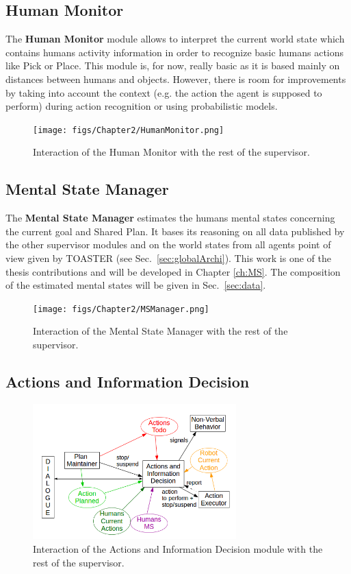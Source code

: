 \documentclass[english,a4paper,11pt,twoside]{StyleThese}
\begin{document}
\subsection{Human Monitor}

The \textbf{Human Monitor} module allows to interpret the current world state which contains humans activity information in order to recognize basic humans actions like Pick or Place. This module is, for now, really basic as it is based mainly on distances between humans and objects. However, there is room for improvements by taking into account the context (e.g. the action the agent is supposed to perform) during action recognition or using probabilistic models.


\begin{figure}[!h]
	\centering
    \texttt{[image: figs/Chapter2/HumanMonitor.png]}
    \caption{Interaction of the Human Monitor with the rest of the supervisor.}
    \label{fig:humanMonitor}
\end{figure}

\subsection{Mental State Manager}

The \textbf{Mental State Manager} estimates the humans mental states concerning the current goal and Shared Plan. It bases its reasoning on all data published by the other supervisor modules and on the world states from all agents point of view given by TOASTER (see Sec.~\ref{sec:globalArchi}). This work is one of the thesis contributions and will be developed in Chapter \ref{ch:MS}. The composition of the estimated mental states will be given in Sec.~\ref{sec:data}. 

\begin{figure}[!h]
	\centering
    \texttt{[image: figs/Chapter2/MSManager.png]}
    \caption{Interaction of the Mental State Manager with the rest of the supervisor.}
    \label{fig:MSManager}
\end{figure}

\subsection{Actions and Information Decision}

\begin{figure}[h]
	\centering
    \includegraphics[width=0.7\textwidth]{figs/Chapter2/RobotDecision.png}
    \caption{Interaction of the Actions and Information Decision module with the rest of the supervisor.}
    \label{fig:robotDecition}
\end{figure}
\end{document}
